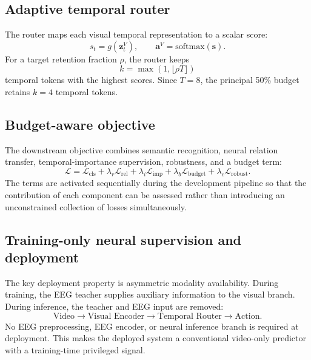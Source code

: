 \documentclass[runningheads]{llncs}
\begin{document}
\subsection{Adaptive temporal router}

The router maps each visual temporal representation to a scalar score:
\begin{equation}
s_{t}=g(\mathbf{z}^{V}_{t}),
\qquad
\mathbf{a}^{V}=\mathrm{softmax}(\mathbf{s}).
\end{equation}
For a target retention fraction $\rho$, the router keeps
\begin{equation}
k=\max(1,\lfloor\rho T\rfloor)
\end{equation}
temporal tokens with the highest scores. Since $T=8$, the principal 50\% budget retains $k=4$ temporal tokens.

\subsection{Budget-aware objective}

The downstream objective combines semantic recognition, neural relation transfer, temporal-importance supervision, robustness, and a budget term:
\begin{equation}
\mathcal{L}
=
\mathcal{L}_{\mathrm{cls}}
+\lambda_{r}\mathcal{L}_{\mathrm{rel}}
+\lambda_{i}\mathcal{L}_{\mathrm{imp}}
+\lambda_{b}\mathcal{L}_{\mathrm{budget}}
+\lambda_{c}\mathcal{L}_{\mathrm{robust}}.
\end{equation}
The terms are activated sequentially during the development pipeline so that the contribution of each component can be assessed rather than introducing an unconstrained collection of losses simultaneously.

\subsection{Training-only neural supervision and deployment}

The key deployment property is asymmetric modality availability. During training, the EEG teacher supplies auxiliary information to the visual branch. During inference, the teacher and EEG input are removed:
\begin{equation}
\text{Video}\rightarrow\text{Visual Encoder}\rightarrow\text{Temporal Router}\rightarrow\text{Action}.
\end{equation}
No EEG preprocessing, EEG encoder, or neural inference branch is required at deployment. This makes the deployed system a conventional video-only predictor with a training-time privileged signal.
\end{document}
